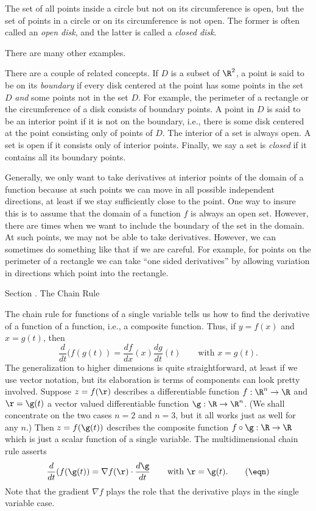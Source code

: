 \medskip
\centerline{}
\medskip
The set of all points inside a circle but not on its circumference
is open, but the set of points in a circle or on its circumference
is not open.   The former is often called an {\it open disk},
and the latter is called a {\it closed disk}.

There are many other examples.
\endexample

There are a couple of related concepts.   If $D$ is a subset of
$\R^2$, a point is said to be on its {\it boundary\/} if
every disk centered at the point has some points in the set $D$
{\it and\/} some points not in the set $D$.  For example,
%
the perimeter of
a rectangle or the circumference of a disk consists of boundary
points. A point in $D$ is said to be an interior point if it
is not on the boundary, i.e., there is some disk centered at
the point consisting only of points of $D$.   The interior of
a set is always open.  A set is open if it consists only of
interior points.   
Finally, we say a set is {\it closed\/} if it contains all its
%
boundary points.
\medskip
\centerline{}
\medskip
Generally, we only want to take derivatives at interior
points of the domain of a function because at such points we
can move in all possible independent directions, at least if
we stay sufficiently close to the point.   One way to insure
this is to assume that the domain of a function $f$ is
always an open set.   However, there are times when
we want to include the boundary of the set in the domain.  At
such points, we may not be able to take derivatives.  However,
we can sometimes do something like that if we are careful.
For example, for points on the perimeter of a rectangle we
can take ``one sided derivatives'' by allowing variation in
directions which point into the rectangle.
\smallskip
{}
\bigskip

\bigskip
{}
\head Section \sn. The Chain Rule \endhead

The chain rule for functions of a single variable tells us how to
find the derivative of a function of a function, i.e., a composite
function.   Thus, if  $y = f(x)$ and $x = g(t)$, then
$$
     \frac d{dt}(f(g(t)) = \frac {df}{dx}(x)\frac{dg}{dt}(t)\qquad
\text{with } x = g(t).
$$
  The generalization to higher dimensions
is quite straightforward, at least if we use vector notation, but
its elaboration is terms of components can look pretty involved.
Suppose $z = f(\r)$ describes a differentiable
 function $f:\R^n \to \R$ and
$\r = \g(t)$ a vector valued differentiable 
function $\g:\R \to \R^n$.   (We shall concentrate on the two
cases $n = 2$ and $n = 3$, but it all works just as well for
any 
$n$.)   Then
$z = f(\g(t))$ describes the composite function $f\circ\g:
\R \to \R$ which is just a scalar function of a single variable.
The multidimensional chain rule asserts
\nexteqn
\xdef\ChR{\eqn}
$$
     \frac d{dt}(f(\g(t)) = \nabla f(\r)\cdot \frac{d\g}{dt}\qquad
\text{with } \r = \g(t).\tag\eqn
$$
%
Note that the gradient $\nabla f$ plays the role that the derivative
plays in the single variable case.

